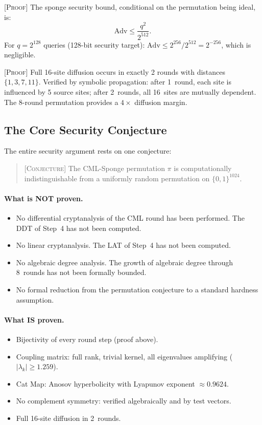 \documentclass[runningheads]{llncs}
\newcommand{\proof}[1]{\textsc{[Proof]} #1}
\newcommand{\conjecture}[1]{\textsc{[Conjecture]} #1}
\begin{document}
\proof{The sponge security bound, conditional on the permutation being ideal, is:
\[
  \mathrm{Adv} \leq \frac{q^2}{2^{512}}.
\]
For $q = 2^{128}$ queries (128-bit security target):
$\mathrm{Adv} \leq 2^{256}/2^{512} = 2^{-256}$, which is negligible.}

\proof{Full 16-site diffusion occurs in exactly 2 rounds with distances $\{1,3,7,11\}$.
Verified by symbolic propagation: after 1~round, each site is influenced by
5 source sites; after 2~rounds, all 16~sites are mutually dependent.
The 8-round permutation provides a $4\times$ diffusion margin.}

\subsection{The Core Security Conjecture}

The entire security argument rests on one conjecture:

\begin{quote}
\conjecture{The CML-Sponge permutation $\pi$ is computationally indistinguishable
from a uniformly random permutation on $\{0,1\}^{1024}$.}
\end{quote}

\paragraph{What is NOT proven.}
\begin{itemize}[nosep]
\item No differential cryptanalysis of the CML round has been performed.
  The DDT of Step~4 has not been computed.
\item No linear cryptanalysis.  The LAT of Step~4 has not been computed.
\item No algebraic degree analysis.  The growth of algebraic degree through
  8~rounds has not been formally bounded.
\item No formal reduction from the permutation conjecture to a standard
  hardness assumption.
\end{itemize}

\paragraph{What IS proven.}
\begin{itemize}[nosep]
\item Bijectivity of every round step (proof above).
\item Coupling matrix: full rank, trivial kernel, all eigenvalues amplifying
  ($|\lambda_k| \geq 1.259$).
\item Cat Map: Anosov hyperbolicity with Lyapunov exponent $\approx 0.9624$.
\item No complement symmetry: verified algebraically and by test vectors.
\item Full 16-site diffusion in 2~rounds.
\end{itemize}
\end{document}
